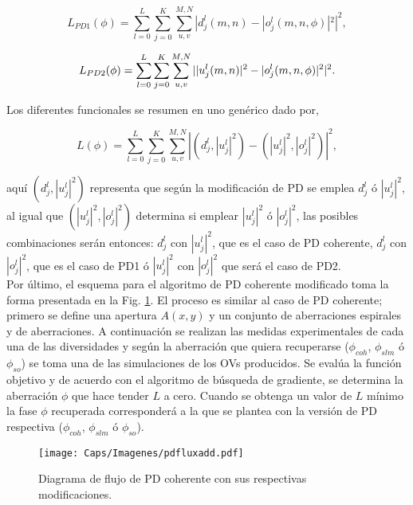 \begin{equation}
	L_{PD1}(\phi) =\sum\limits_{l=0}^L \sum\limits_{j=0}^K \sum\limits_{u,v}^{M,N} |d_j^l(m,n) - |o_j^l(m,n,\phi)|^2|^2,
\end{equation}

\begin{equation}
	L_{PD2}(\phi) =\sum\limits_{l=0}^L \sum\limits_{j=0}^K \sum\limits_{u,v}^{M,N} \arrowvert |u_j^l(m,n)|^2 - |o_j^l(m,n,\phi)|^2 \arrowvert ^2.
\end{equation}


Los diferentes funcionales se resumen en uno genérico dado por,

\begin{equation}
\label{eqDfunc123}
 L(\phi) = \sum\limits_{l=0}^L \sum\limits_{j=0}^K \sum\limits_{u,v}^{M,N} |(d_j^l, |u_j^l|^2) - (|u_j^l|^2,|o_j^l|^2)|^2,
\end{equation}

aquí $(d_j^l, |u_j^l|^2)$ representa que según la modificación de PD se emplea $d_j^l$ ó $|u_j^l|^2$, al igual que $(|u_j^l|^2,|o_j^l|^2)$ determina si emplear $|u_j^l|^2$ ó $|o_j^l|^2$, las posibles combinaciones serán entonces: $d_j^l$ con $|u_j^l|^2$, que es el caso de PD coherente, $d_j^l$ con $|o_j^l|^2$, que es el caso de PD1 ó $|u_j^l|^2$ con $|o_j^l|^2$ que será el caso de PD2.\\

Por último, el esquema para el algoritmo de PD coherente modificado toma la forma presentada en la Fig. \ref{fig:pdfluxadd}. El proceso es similar al caso de PD coherente; primero se define una apertura $A(x,y)$ y un conjunto de aberraciones espirales y de aberraciones. A continuación se realizan las medidas experimentales de cada una de las diversidades y según la aberración que quiera recuperarse ($\phi _{coh}$, $\phi_{slm}$ ó $\phi_{so}$) se toma una de las simulaciones de los OVs producidos. Se evalúa la función objetivo y de acuerdo con el algoritmo de búsqueda de gradiente, se determina la aberración $\phi$ que hace tender $L$ a cero. Cuando se obtenga un valor de $L$ mínimo la fase $\phi$ recuperada corresponderá a la que se plantea con la versión de PD respectiva ($\phi _{coh}$, $\phi_{slm}$ ó $\phi_{so}$).
\begin{figure}[!ht]
  \centering
    \texttt{[image: Caps/Imagenes/pdfluxadd.pdf]}
  \caption{Diagrama de flujo de PD coherente con sus respectivas modificaciones.}
  \label{fig:pdfluxadd}
\end{figure}
